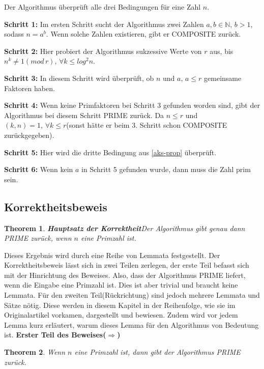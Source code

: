 \documentclass[12pt,oneside]{article}
\newtheorem{theorem}{Theorem}[section]
\theoremstyle{remark}
\theoremstyle{definition}
\begin{document}
Der Algorithmus überprüft alle drei Bedingungen für eine Zahl $n$.\newline

\textbf{Schritt 1: }Im ersten Schritt sucht der Algorithmus zwei Zahlen $a,b \in \mathbb{N}, \, b > 1$, sodass $n = a^b$. Wenn solche Zahlen existieren, gibt er COMPOSITE zurück.  

\textbf{Schritt 2: }Hier probiert der Algorithmus sukzessive Werte von $r$ aus, bis $n^k \neq 1 (mod \, r), \, \forall k \leq log^2 n$.

\textbf{Schritt 3: } In diesem Schritt wird überprüft, ob $n$ und $a, \, a \leq r$ gemeinsame Faktoren haben. 

\textbf{Schritt 4: } Wenn keine Primfaktoren bei Schritt 3 gefunden worden sind, gibt der Algorithmus bei diesem Schritt PRIME zurück. Da $n \leq r$ und $(k,n) = 1, \, \forall k \leq r $(sonst hätte er beim 3. Schritt schon COMPOSITE zurückgegeben).

\textbf{Schritt 5: } Hier wird die dritte Bedingung aus \ref{aks-prop} überprüft.

\textbf{Schritt 6: } Wenn kein $a$ in Schritt 5 gefunden wurde, dann muss die Zahl prim sein. 
\subsection{Korrektheitsbeweis}

\begin{theorem}
\textbf{Hauptsatz der Korrektheit}\newline Der Algorithmus gibt genau dann PRIME zurück, wenn $n$ eine Primzahl ist.
\end{theorem}
Dieses Ergebnis wird durch eine Reihe von Lemmata festgestellt. Der Korrektheitsbeweis lässt sich in zwei Teilen zerlegen, der erste Teil befasst sich mit der Hinrichtung des Beweises. Also, dass der Algorithmus PRIME liefert, wenn die Eingabe eine Primzahl ist. Dies ist aber trivial und braucht keine Lemmata. Für den zweiten Teil(Rückrichtung) sind jedoch mehrere Lemmata und Sätze nötig. Diese werden in diesem Kapitel in der Reihenfolge, wie sie im Originalartikel vorkamen, dargestellt und bewiesen. Zudem wird vor jedem Lemma kurz erläutert, warum dieses Lemma für den Algorithmus von Bedeutung ist.
\textbf{Erster Teil des Beweises($\Rightarrow$)}
\begin{theorem}\label{hin_rich}
Wenn $n$ eine Primzahl ist, dann gibt der Algorithmus PRIME zurück.
\end{theorem}
\end{document}
